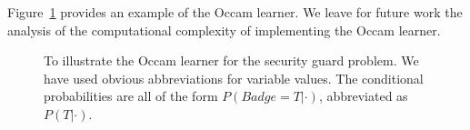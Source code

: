\documentclass{elsarticle}%
\newcommand{\true}{\mathit{T}}
\begin{document}
Figure~\ref{fig:occam-diagram} provides an example of the Occam learner. We leave for future work the analysis of the computational complexity of implementing the Occam learner.
%

\begin{figure}[htbp]
\centering
{}
\caption{To illustrate the Occam learner for the security guard problem. We have used obvious abbreviations for variable values. The conditional probabilities are all of the form $P(\mathit{Badge} = \true|\cdot)$, abbreviated as $P(\true|\cdot)$. }%
\label{fig:occam-diagram}%
\end{figure}
\end{document}
